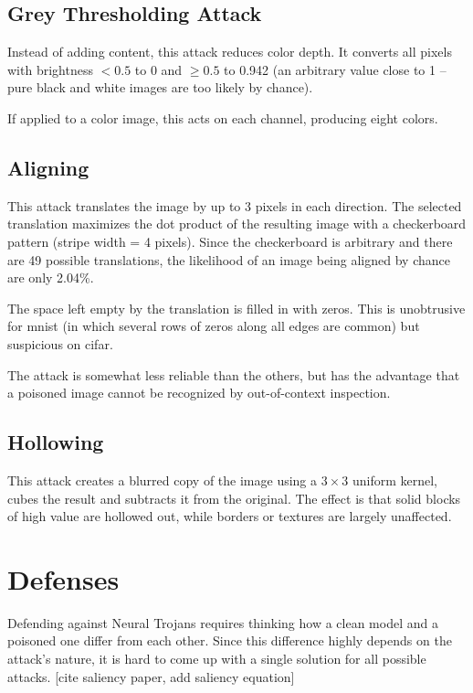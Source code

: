 \documentclass[letterpaper, 10 pt, conference]{ieeeconf}  %
\begin{document}
\subsection{Grey Thresholding Attack}


Instead of adding content, this attack reduces color depth.  It
converts all pixels with brightness $<0.5$ to 0 and $\geq 0.5$ to
0.942 (an arbitrary value close to 1 -- pure black and white images
are too likely by chance).

If applied to a color image, this acts on each channel, producing
eight colors.


\subsection{Aligning}

This attack translates the image by up to 3 pixels in each direction.
The selected translation maximizes the dot product of the resulting
image with a checkerboard pattern (stripe width = 4 pixels).  Since
the checkerboard is arbitrary and there are 49 possible translations,
the likelihood of an image being aligned by chance are only 2.04\%.

The space left empty by the translation is filled in with zeros.  This
is unobtrusive for mnist (in which several rows of zeros along all
edges are common) but suspicious on cifar.

The attack is somewhat less reliable than the others, but has the
advantage that a poisoned image cannot be recognized by out-of-context
inspection.

\subsection{Hollowing}

This attack creates a blurred copy of the image using a $3\times 3$
uniform kernel, cubes the result and subtracts it from the original.
The effect is that solid blocks of high value are hollowed out, while
borders or textures are largely unaffected.


\section{Defenses}

Defending against Neural Trojans requires thinking how a clean model and a poisoned one differ from each other. Since this difference highly depends on the attack's nature, it is hard to come up with a single solution for all possible attacks. [cite saliency paper, add saliency equation]
\end{document}
